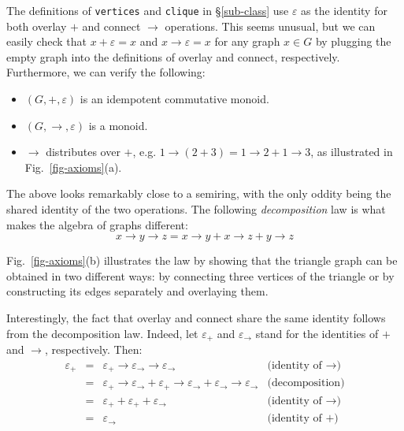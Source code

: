 \documentclass[acmlarge,anonymous]{acmart}\settopmatter{printfolios=true}
\newcommand{\hs}{\texttt}
\begin{document}
The definitions of \hs{vertices} and \hs{clique} in \S\ref{sub-class}
use $\varepsilon$ as the identity for both overlay $+$ and connect $\rightarrow$
operations. This seems unusual, but we can easily check that
$x + \varepsilon = x$ and $x \rightarrow \varepsilon = x$ for any graph $x \in G$
by plugging the empty graph into the definitions of overlay and connect,
respectively. Furthermore, we can verify the following:
\begin{itemize}
    \item $(G,+,\varepsilon)$ is an idempotent commutative monoid.
    \item $(G,\rightarrow,\varepsilon)$ is a monoid.
    \item $\rightarrow$ distributes over $+$, e.g.
    $1 \rightarrow (2 + 3) = 1 \rightarrow 2 + 1 \rightarrow 3$, as illustrated
    in Fig.~\ref{fig-axioms}(a).
\end{itemize}

\noindent
The above looks remarkably close to a semiring, with the only oddity being the shared
identity of the two operations. The following \emph{decomposition} law is
what makes the algebra of graphs different:
\[
x \rightarrow y \rightarrow z = x \rightarrow y + x \rightarrow z + y \rightarrow z
\]

\noindent
Fig.~\ref{fig-axioms}(b) illustrates the law by showing that the triangle
graph can be obtained in two different ways: by connecting three vertices
of the triangle or by constructing its edges separately and overlaying them.

Interestingly, the fact that overlay and connect share the same identity
follows from the decomposition law. Indeed, let $\varepsilon_{+}$ and
$\varepsilon_{\rightarrow}$ stand for the identities of $+$ and $\rightarrow$,
respectively. Then:
\[
\begin{array}{rcll}
\varepsilon_{+} & = & \varepsilon_{+} \rightarrow \varepsilon_{\rightarrow} \rightarrow \varepsilon_{\rightarrow} & \text{(identity of $\rightarrow$)}\\
 & = & \varepsilon_{+} \rightarrow \varepsilon_{\rightarrow} + \varepsilon_{+} \rightarrow \varepsilon_{\rightarrow} + \varepsilon_{\rightarrow} \rightarrow \varepsilon_{\rightarrow} & \text{(decomposition)}\\
 & = & \varepsilon_{+} + \varepsilon_{+} + \varepsilon_{\rightarrow} & \text{(identity of $\rightarrow$)}\\
 & = & \varepsilon_{\rightarrow} & \text{(identity of $+$)}\\
\end{array}
\]
\end{document}
